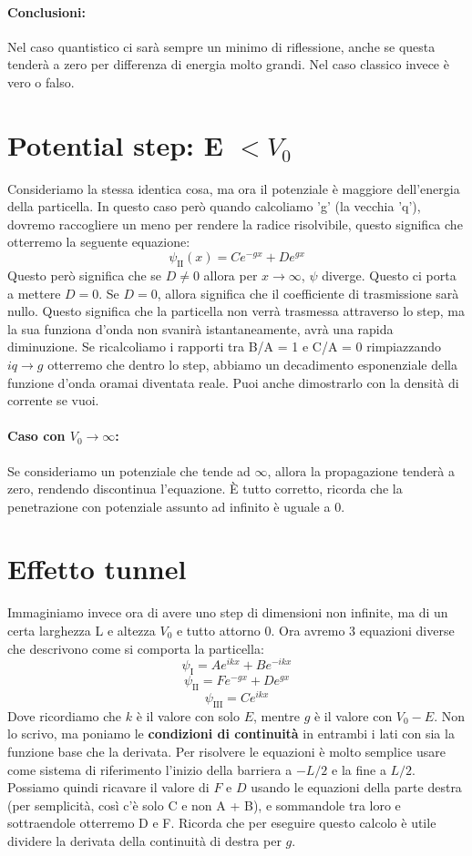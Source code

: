 \paragraph{Conclusioni:}
Nel caso quantistico ci sarà sempre un minimo di riflessione, anche se questa tenderà a zero per differenza di energia molto grandi. Nel caso classico invece è vero o falso.

\section{Potential step: E $< V_0$}

Consideriamo la stessa identica cosa, ma ora il potenziale è maggiore dell'energia della particella. In questo caso però quando calcoliamo 'g' (la vecchia 'q'), dovremo raccogliere un meno per rendere la radice risolvibile, questo significa che otterremo la seguente equazione:
$$\psi_{\text{II}}(x) = Ce^{-gx}+De^{gx}$$
Questo però significa che se $D \neq 0$ allora per $x \rightarrow \infty$, $\psi$ diverge. Questo ci porta a mettere $D = 0$. Se $D=0$, allora significa che il coefficiente di trasmissione sarà nullo. Questo significa che la particella non verrà trasmessa attraverso lo step, ma la sua funziona d'onda non svanirà istantaneamente, avrà una rapida diminuzione.
Se ricalcoliamo i rapporti tra B/A = 1 e C/A = 0 rimpiazzando $iq \rightarrow g$ otterremo che dentro lo step, abbiamo un decadimento esponenziale della funzione d'onda oramai diventata reale. Puoi anche dimostrarlo con la densità di corrente se vuoi.

\paragraph{Caso con $V_0 \rightarrow \infty$:} Se consideriamo un potenziale che tende ad $\infty$, allora la propagazione tenderà a zero, rendendo discontinua l'equazione. È tutto corretto, ricorda che la penetrazione con potenziale assunto ad infinito è uguale a 0.

\section{Effetto tunnel}

Immaginiamo invece ora di avere uno step di dimensioni non infinite, ma di un certa larghezza L e altezza $V_0$ e tutto attorno 0. Ora avremo 3 equazioni diverse che descrivono come si comporta la particella:
$$\psi_{\text{I}} = Ae^{ikx} + Be^{-ikx}$$
$$\psi_{\text{II}} = Fe^{-gx} + De^{gx}$$
$$\psi_{\text{III}} = Ce^{ikx}$$
Dove ricordiamo che $k$ è il valore con solo $E$, mentre $g$ è il valore con $V_0 - E$. Non lo scrivo, ma poniamo le \textbf{condizioni di continuità} in entrambi i lati con sia la funzione base che la derivata. Per risolvere le equazioni è molto semplice usare come sistema di riferimento l'inizio della barriera a $-L/2$ e la fine a $L/2$. Possiamo quindi ricavare il valore di $F$ e $D$ usando le equazioni della parte destra (per semplicità, così c'è solo C e non A + B), e sommandole tra loro e sottraendole otterremo D e F. Ricorda che per eseguire questo calcolo è utile dividere la derivata della continuità di destra per $g$.


